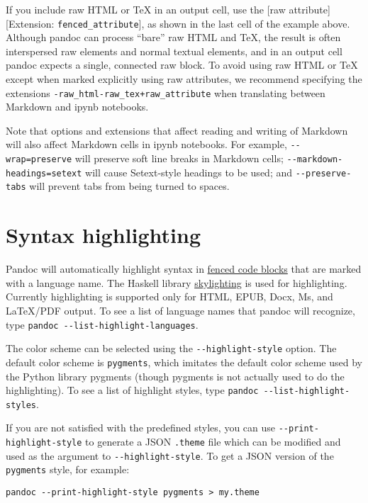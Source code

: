 If you include raw HTML or TeX in an output cell, use the {[}raw
attribute{]}{[}Extension: \texttt{fenced\_attribute}{]}, as shown in the
last cell of the example above. Although pandoc can process ``bare'' raw
HTML and TeX, the result is often interspersed raw elements and normal
textual elements, and in an output cell pandoc expects a single,
connected raw block. To avoid using raw HTML or TeX except when marked
explicitly using raw attributes, we recommend specifying the extensions
\texttt{-raw\_html-raw\_tex+raw\_attribute} when translating between
Markdown and ipynb notebooks.

Note that options and extensions that affect reading and writing of
Markdown will also affect Markdown cells in ipynb notebooks. For
example, \texttt{-\/-wrap=preserve} will preserve soft line breaks in
Markdown cells; \texttt{-\/-markdown-headings=setext} will cause
Setext-style headings to be used; and \texttt{-\/-preserve-tabs} will
prevent tabs from being turned to spaces.

\hypertarget{syntax-highlighting}{%
\section{Syntax highlighting}\label{syntax-highlighting}}

Pandoc will automatically highlight syntax in
\protect\hyperlink{fenced-code-blocks}{fenced code blocks} that are
marked with a language name. The Haskell library
\href{https://github.com/jgm/skylighting}{skylighting} is used for
highlighting. Currently highlighting is supported only for HTML, EPUB,
Docx, Ms, and LaTeX/PDF output. To see a list of language names that
pandoc will recognize, type
\texttt{pandoc\ -\/-list-highlight-languages}.

The color scheme can be selected using the \texttt{-\/-highlight-style}
option. The default color scheme is \texttt{pygments}, which imitates
the default color scheme used by the Python library pygments (though
pygments is not actually used to do the highlighting). To see a list of
highlight styles, type \texttt{pandoc\ -\/-list-highlight-styles}.

If you are not satisfied with the predefined styles, you can use
\texttt{-\/-print-highlight-style} to generate a JSON \texttt{.theme}
file which can be modified and used as the argument to
\texttt{-\/-highlight-style}. To get a JSON version of the
\texttt{pygments} style, for example:

\begin{verbatim}
pandoc --print-highlight-style pygments > my.theme
\end{verbatim}


